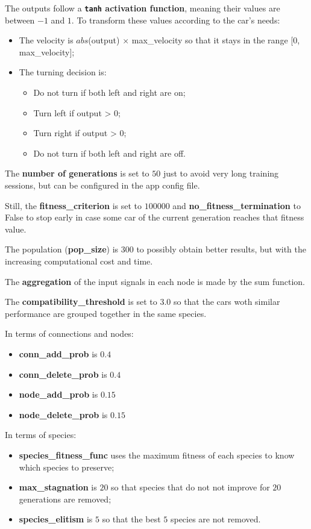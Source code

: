 \documentclass[a4paper]{article}
\begin{document}
The outputs follow a \textbf{\texttt{tanh} activation function}, meaning their values are between $-1$ and $1$. To transform these values according to the car's needs:
\begin{itemize}
    \item The velocity is $abs$(output) $\times$ max\_velocity so that it stays in the range [0, max\_velocity];
    \item The turning decision is:
    \begin{itemize}
        \item Do not turn if both left and right are on;
        \item Turn left if output > 0;
        \item Turn right if output > 0;
        \item Do not turn if both left and right are off.
    \end{itemize}
\end{itemize}

The \textbf{number of generations} is set to $50$ just to avoid very long training sessions, but can be configured in the app config file.

Still, the \textbf{fitness\_criterion} is set to $100000$ and \textbf{no\_fitness\_termination} to False to stop early in case some car of the current generation reaches that fitness value.

The population (\textbf{pop\_size}) is $300$ to possibly obtain better results, but with the increasing computational cost and time.

The \textbf{aggregation} of the input signals in each node is made by the sum function.

The \textbf{compatibility\_threshold} is set to $3.0$ so that the cars woth similar performance are grouped together in the same species.

In terms of connections and nodes:
\begin{itemize}
    \item \textbf{conn\_add\_prob} is $0.4$
    \item \textbf{conn\_delete\_prob} is $0.4$
    \item \textbf{node\_add\_prob} is $0.15$
    \item \textbf{node\_delete\_prob} is $0.15$
\end{itemize}

In terms of species:
\begin{itemize}
    \item \textbf{species\_fitness\_func} uses the maximum fitness of each species to know which species to preserve;
    \item \textbf{max\_stagnation} is $20$ so that species that do not not improve for $20$ generations are removed;
    \item \textbf{species\_elitism} is $5$ so that the best $5$ species are not removed.
\end{itemize}
\end{document}
